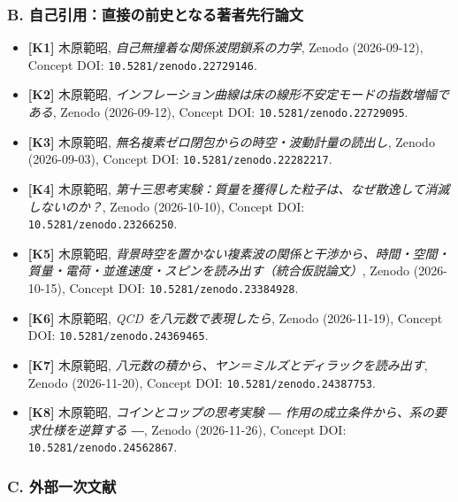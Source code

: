 \documentclass[
  a4paper,
]{ltjsarticle}
\providecommand{\tightlist}{%
  \setlength{\itemsep}{0pt}\setlength{\parskip}{0pt}}
\begin{document}
\subsubsection{B.
自己引用：直接の前史となる著者先行論文}\label{b.-ux81eaux5df1ux5f15ux7528ux76f4ux63a5ux306eux524dux53f2ux3068ux306aux308bux8457ux8005ux5148ux884cux8ad6ux6587}

\begin{itemize}
\tightlist
\item
  \textbf{{[}K1{]}} 木原範昭, \emph{自己無撞着な関係波閉鎖系の力学},
  Zenodo (2026-09-12), Concept DOI: \texttt{10.5281/zenodo.22729146}.
\item
  \textbf{{[}K2{]}} 木原範昭,
  \emph{インフレーション曲線は床の線形不安定モードの指数増幅である},
  Zenodo (2026-09-12), Concept DOI: \texttt{10.5281/zenodo.22729095}.
\item
  \textbf{{[}K3{]}} 木原範昭,
  \emph{無名複素ゼロ閉包からの時空・波動計量の読出し}, Zenodo
  (2026-09-03), Concept DOI: \texttt{10.5281/zenodo.22282217}.
\item
  \textbf{{[}K4{]}} 木原範昭,
  \emph{第十三思考実験：質量を獲得した粒子は、なぜ散逸して消滅しないのか？},
  Zenodo (2026-10-10), Concept DOI: \texttt{10.5281/zenodo.23266250}.
\item
  \textbf{{[}K5{]}} 木原範昭,
  \emph{背景時空を置かない複素波の関係と干渉から、時間・空間・質量・電荷・並進速度・スピンを読み出す（統合仮説論文）},
  Zenodo (2026-10-15), Concept DOI: \texttt{10.5281/zenodo.23384928}.
\item
  \textbf{{[}K6{]}} 木原範昭, \emph{QCD を八元数で表現したら}, Zenodo
  (2026-11-19), Concept DOI: \texttt{10.5281/zenodo.24369465}.
\item
  \textbf{{[}K7{]}} 木原範昭,
  \emph{八元数の積から、ヤン＝ミルズとディラックを読み出す}, Zenodo
  (2026-11-20), Concept DOI: \texttt{10.5281/zenodo.24387753}.
\item
  \textbf{{[}K8{]}} 木原範昭, \emph{コインとコップの思考実験 ―
  作用の成立条件から、系の要求仕様を逆算する ―}, Zenodo (2026-11-26),
  Concept DOI: \texttt{10.5281/zenodo.24562867}.
\end{itemize}

\subsubsection{C.
外部一次文献}\label{c.-ux5916ux90e8ux4e00ux6b21ux6587ux732e}
\end{document}
